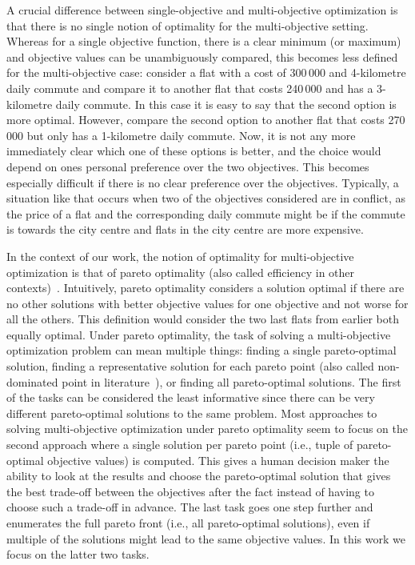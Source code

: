 A crucial difference between single-objective and multi-objective optimization is that there is no single notion of optimality for the multi-objective setting.
Whereas for a single objective function, there is a clear minimum (or maximum) and objective values can be unambiguously compared, this becomes less defined for the multi-objective case:
consider a flat with a cost of 300\,000 \texteuro{} and 4-kilometre daily commute and compare it to another flat that costs 240\,000 \texteuro{} and has a 3-kilometre daily commute.
In this case it is easy to say that the second option is more optimal.
However, compare the second option to another flat that costs 270\,000 \texteuro{} but only has a 1-kilometre daily commute.
Now, it is not any more immediately clear which one of these options is better, and the choice would depend on ones personal preference over the two objectives.
This becomes especially difficult if there is no clear preference over the objectives.
Typically, a situation like that occurs when two of the objectives considered are in conflict, as the price of a flat and the corresponding daily commute might be if the commute is towards the city centre and flats in the city centre are more expensive.

In the context of our work, the notion of optimality for multi-objective optimization is that of pareto optimality (also called efficiency in other contexts)~\autocite{Ehrgott2005-2}.
Intuitively, pareto optimality considers a solution optimal if there are no other solutions with better objective values for one objective and not worse for all the others. 
This definition would consider the two last flats from earlier both equally optimal.
Under pareto optimality, the task of solving a multi-objective optimization problem can mean multiple things:
finding a single pareto-optimal solution, finding a representative solution for each pareto point (also called non-dominated point in literature~\autocite{Ehrgott2005-2}), or finding all pareto-optimal solutions.
The first of the tasks can be considered the least informative since there can be very different pareto-optimal solutions to the same problem.
Most approaches to solving multi-objective optimization under pareto optimality seem to focus on the second approach where a single solution per pareto point (i.e., tuple of pareto-optimal objective values) is computed.
This gives a human decision maker the ability to look at the results and choose the pareto-optimal solution that gives the best trade-off between the objectives after the fact instead of having to choose such a trade-off in advance.
The last task goes one step further and enumerates the full pareto front (i.e., all pareto-optimal solutions), even if multiple of the solutions might lead to the same objective values.
In this work we focus on the latter two tasks.

